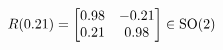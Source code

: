 \documentclass[preview]{standalone}
\begin{document}
\begin{align*}
\special{dvisvgm:raw <g id='unique000'>}R(0.21) = \begin{bmatrix} 0.98 & -0.21 \\ 0.21 & 0.98 \end{bmatrix} \in \text{SO}(2)\special{dvisvgm:raw </g>}
\end{align*}
\end{document}
